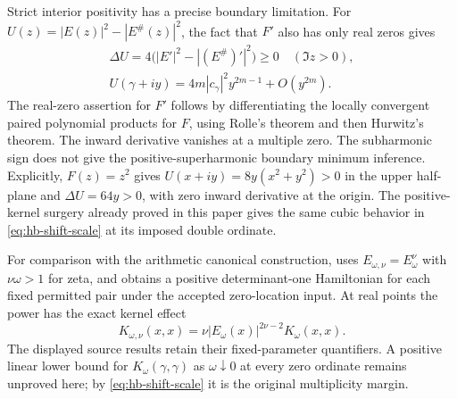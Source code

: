Strict interior positivity has a precise boundary limitation.
For $U(z)=|E(z)|^2-|E^\#(z)|^2$, the fact that $F'$ also
has only real zeros gives
\[
 \begin{gathered}
 \Delta U=4\bigl(|E'|^2-|(E^\#)'|^2\bigr)\ge0\quad(\Im z>0),\\
 U(\gamma+iy)=4m|c_\gamma|^2y^{2m-1}+O(y^{2m}).
 \end{gathered}
\]
The real-zero assertion for $F'$ follows by differentiating
the locally convergent paired polynomial products for $F$,
using Rolle's theorem and then Hurwitz's theorem.
The inward derivative vanishes at a multiple zero. The
subharmonic sign does not give the positive-superharmonic
boundary minimum inference. Explicitly, $F(z)=z^2$ gives
$U(x+iy)=8y(x^2+y^2)>0$ in the upper half-plane and
$\Delta U=64y>0$, with zero inward derivative at the origin.
The positive-kernel surgery already proved in this paper
gives the same cubic behavior in \eqref{eq:hb-shift-scale}
at its imposed double ordinate.

For comparison with the arithmetic canonical construction,
\cite[equations~(2.4)--(2.13), Theorems~2.1--2.4,
pp.~6--9]{suzuki-hamiltonians2021} uses
$E_{\omega,\nu}=E_\omega^\nu$ with $\nu\omega>1$ for zeta,
and obtains a positive determinant-one Hamiltonian for
each fixed permitted pair under the accepted zero-location
input. At real points the power has the exact kernel effect
\[
 K_{\omega,\nu}(x,x)
       =\nu|E_\omega(x)|^{2\nu-2}K_\omega(x,x).
\]
The displayed source results retain their fixed-parameter
quantifiers. A positive linear lower bound for
$K_\omega(\gamma,\gamma)$ as $\omega\downarrow0$ at every
zero ordinate remains unproved here; by
\eqref{eq:hb-shift-scale} it is the original multiplicity
margin.
